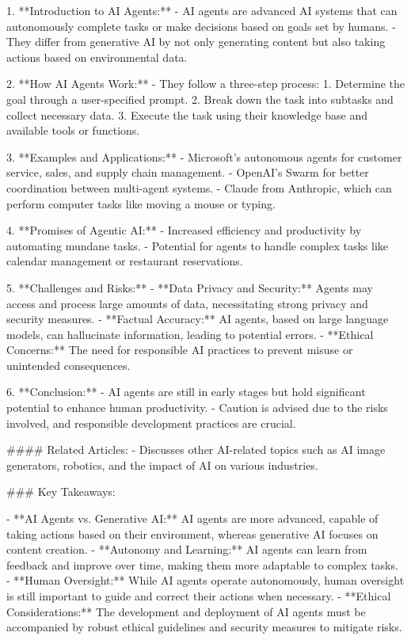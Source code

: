 1. **Introduction to AI Agents:**
   - AI agents are advanced AI systems that can autonomously complete tasks or make decisions based on goals set by humans.
   - They differ from generative AI by not only generating content but also taking actions based on environmental data.

2. **How AI Agents Work:**
   - They follow a three-step process: 
     1. Determine the goal through a user-specified prompt.
     2. Break down the task into subtasks and collect necessary data.
     3. Execute the task using their knowledge base and available tools or functions.

3. **Examples and Applications:**
   - Microsoft's autonomous agents for customer service, sales, and supply chain management.
   - OpenAI's Swarm for better coordination between multi-agent systems.
   - Claude from Anthropic, which can perform computer tasks like moving a mouse or typing.

4. **Promises of Agentic AI:**
   - Increased efficiency and productivity by automating mundane tasks.
   - Potential for agents to handle complex tasks like calendar management or restaurant reservations.

5. **Challenges and Risks:**
   - **Data Privacy and Security:** Agents may access and process large amounts of data, necessitating strong privacy and security measures.
   - **Factual Accuracy:** AI agents, based on large language models, can hallucinate information, leading to potential errors.
   - **Ethical Concerns:** The need for responsible AI practices to prevent misuse or unintended consequences.

6. **Conclusion:**
   - AI agents are still in early stages but hold significant potential to enhance human productivity.
   - Caution is advised due to the risks involved, and responsible development practices are crucial.

#### Related Articles:
- Discusses other AI-related topics such as AI image generators, robotics, and the impact of AI on various industries.

### Key Takeaways:

- **AI Agents vs. Generative AI:** AI agents are more advanced, capable of taking actions based on their environment, whereas generative AI focuses on content creation.
- **Autonomy and Learning:** AI agents can learn from feedback and improve over time, making them more adaptable to complex tasks.
- **Human Oversight:** While AI agents operate autonomously, human oversight is still important to guide and correct their actions when necessary.
- **Ethical Considerations:** The development and deployment of AI agents must be accompanied by robust ethical guidelines and security measures to mitigate risks.

